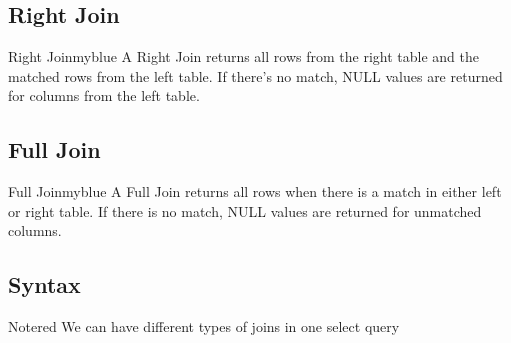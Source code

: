 \vspace{0.25cm}
\subsection{Right Join}
\begin{prettyBox}{Right Join}{myblue}
A Right Join returns all rows from the right table and the matched rows from the left table. If there’s no match,
NULL values are returned for columns from the left table.
\begin{center}
\end{center}
\end{prettyBox}

\vspace{0.25cm}
\subsection{Full Join}

\begin{prettyBox}{Full Join}{myblue}
A Full Join returns all rows when there is a match in either left or right table. If there is no match,
NULL values are returned for unmatched columns.
\begin{center}
\end{center}
\end{prettyBox}

\vspace{0.25cm}
\subsection*{ \textbf{Syntax}}


\vspace{0.25cm}
\begin{prettyBox}{Note}{red}
We can have different types of joins in one select query
\end{prettyBox}


